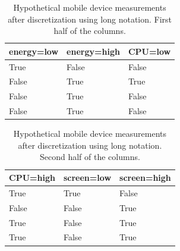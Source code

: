 
\begin{table} %
    \begin{tabular}{ | l | l | l | }
    \hline
    \textbf{energy=low} & \textbf{energy=high} & \textbf{CPU=low} \\ \hline
    True & False & False  \\ \hline 
    False & True & True  \\ \hline 
    False & True & False  \\ \hline 
    False & True & False  \\ \hline
    \end{tabular}
	\caption{Hypothetical mobile device measurements after discretization using long notation. First half of the columns.}
	\label{table:discreteData-1}
\end{table}

\begin{table} %
    \begin{tabular}{ | l | l | l | }
    \hline
    \textbf{CPU=high} & \textbf{screen=low} & \textbf{screen=high} \\ \hline
	True & True & False \\ \hline
	False & False & True \\ \hline    
    True & False & True \\ \hline
    True & False & True \\ \hline
    \end{tabular}
	\caption{Hypothetical mobile device measurements after discretization using long notation. Second half of the columns.}
	\label{table:discreteData-2}
\end{table}



